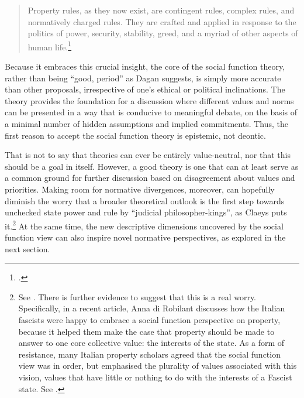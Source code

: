 \begin{quote}
Property rules, as they now exist, are contingent rules, complex rules, and normatively charged rules. They are crafted and applied in response to the politics of power, security, stability, greed, and a myriad of other aspects of human life.\footnote{\cite[376]{underkuffler10}.}
\end{quote}

Because it embraces this crucial insight, the core of the social function theory, rather than being ``good, period'' as Dagan suggests, is simply more accurate than other proposals, irrespective of one's ethical or political inclinations. The theory provides the foundation for a discussion where different values and norms can be presented in a way that is conducive to meaningful debate, on the basis of a minimal number of hidden assumptions and implied commitments. Thus, the first reason to accept the social function theory is epistemic, not deontic.

That is not to say that theories can ever be entirely value-neutral, nor that this should be a goal in itself. However, a good theory is one that can at least serve as a common ground for further discussion based on disagreement about values and priorities.  Making room for normative divergences, moreover, can hopefully diminish the worry that a broader theoretical outlook is the first step towards unchecked state power and rule by ``judicial philosopher-kings'', as Claeys puts it.\footnote{See \cite[944]{claeys09}. There is further evidence to suggest that this is a real worry. Specifically, in a recent article, Anna di Robilant discusses how the Italian fascists were happy to embrace a social function perspective on property, because it helped them make the case that property should be made to answer to one core collective value: the interests of the state. As a form of resistance, many Italian property scholars agreed that the social function view was in order, but emphasised the plurality of values associated with this vision, values that have little or nothing to do with the interests of a Fascist state. See \cite{robilant13}.} At the same time, the new descriptive dimensions uncovered by the social function view can also inspire novel normative perspectives, as explored in the next section.

